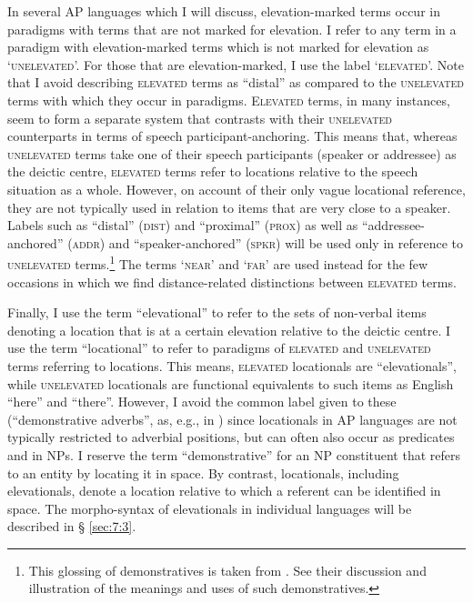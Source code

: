 In several AP languages which I will discuss, elevation-marked terms occur in paradigms with terms that are not marked for elevation. I refer to any term in a paradigm with elevation-marked terms which is not marked for elevation as `\textsc{unelevated}'. For those that are elevation-marked, I use the label `\textsc{elevated'.} Note that I avoid describing \textsc{elevated} terms as ``distal'' as compared to the \textsc{unelevated} terms with which they occur in paradigms. \textsc{Elevated} terms, in many instances, seem to form a separate system that contrasts with their \textsc{unelevated} counterparts in terms of speech participant-anchoring. This means that, whereas \textsc{unelevated} terms take one of their speech participants (speaker or addressee) as the deictic centre, \textsc{elevated} terms refer to locations relative to the speech situation as a whole. However, on account of their only vague locational reference, they are not typically used in relation to items that are very close to a speaker. Labels such as ``distal'' (\textsc{dist}) and ``proximal'' (\textsc{prox}) as well as ``addressee-anchored'' (\textsc{addr)} and ``speaker-anchored'' (\textsc{spkr)} will be used only in reference to \textsc{unelevated} terms.\footnote{This glossing of demonstratives is taken from  \citet{SchapperEtAl2011demnom}. See their discussion and illustration of the meanings and uses of such demonstratives.} The terms `\textsc{near}' and `\textsc{far'} are used instead for the few occasions in which we find distance-related distinctions between \textsc{elevated} terms.

Finally, I use the term ``elevational'' to refer to the sets of non-verbal items denoting a location that is at a certain elevation relative to the deictic centre. I use the term ``locational'' to refer to paradigms of \textsc{elevated} and \textsc{unelevated} terms referring to locations. This means, \textsc{elevated} locationals are ``elevationals'', while \textsc{unelevated} locationals are functional equivalents to such items as English ``here'' and ``there''. However, I avoid the common label given to these (``demonstrative adverbs'', as, e.g., in \citealt{Diessel1999}) since locationals in AP languages are not typically restricted to adverbial positions, but can often also occur as predicates and in NPs. I reserve the term ``demonstrative'' for an NP constituent that refers to an entity by locating it in space. By contrast, locationals, including elevationals, denote a location relative to which a referent can be identified in space. The morpho-syntax of elevationals in individual languages will be described in {\S} \ref{sec:7:3}.

